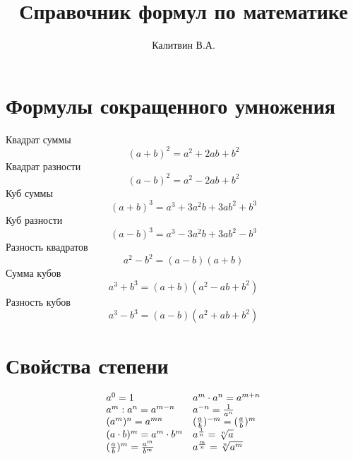 \documentclass[a4paper, 12pt]{article}
\begin{document}
\author{Калитвин В.А.}
\title{Справочник формул по математике}
\maketitle
\thispagestyle{empty}
\newpage
\section{Формулы сокращенного умножения}

Квадрат суммы
$$ (a+b)^2=a^2+2ab+b^2$$
Квадрат разности
$$(a-b)^2=a^2-2ab+b^2$$
Куб суммы
$$(a+b)^3=a^3+3a^2b+3ab^2+b^3$$
Куб разности
$$(a-b)^3=a^3-3a^2b+3ab^2-b^3$$
Разность квадратов
$$a^2-b^2=(a-b)(a+b)$$
Сумма кубов
$$a^3+b^3=(a+b)(a^2-ab+b^2)$$
Разность кубов
$$a^3-b^3=(a-b)(a^2+ab+b^2)$$

\section{Свойства степени}

$$
\begin{array}{ll}
a^0=1  & a^m\cdot a^n=a^{m+n}\\
a^m: a^n=a^{m-n} & a^{-n}=\frac{1}{a^n}\\
(a^m)^n=a^{mn} & (\frac{a}{b})^{-m}=(\frac{a}{b})^{m}\\
(a\cdot b)^m=a^m\cdot b^m & a^{\frac{1}{n}}=\root{n}\of{a}\\
(\frac{a}{b})^m =\frac{a^m}{b^m} & a^{\frac{m}{n}}=\root{n}\of{a^m}\\
\end{array}
$$
\end{document}
